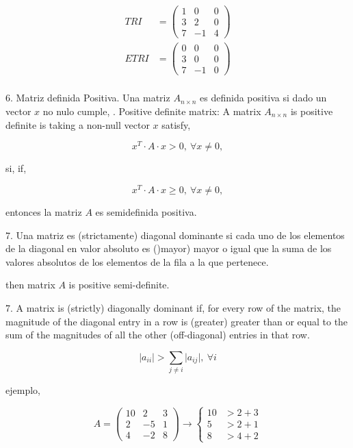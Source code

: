 \begin{align*}
TRI&=\begin{pmatrix}
1 & 0 & 0\\
3 & 2 & 0\\
7 & -1 & 4
\end{pmatrix}\\
ETRI&=\begin{pmatrix}
0 & 0 & 0\\
3 & 0 & 0\\
7 & -1 & 0
\end{pmatrix}\\
\end{align*}
\begin{paracol}{2}
6. Matriz definida Positiva. Una matriz $A_{n \times n}$ es definida positiva si dado un vector $x$ no nulo cumple,
. Positive definite matrix: A matrix $A_{n\times n} $ is positive definite is taking a non-null vector $x$ satisfy,
\end{paracol}
\begin{equation*}
x^T\cdot A \cdot x > 0, \ \forall x\neq 0,
\end{equation*}
\begin{paracol}{2}
si,
\switchcolumn
if,
\end{paracol}
\begin{equation*}
x^T\cdot A \cdot x \geq 0, \ \forall x\neq 0,
\end{equation*}
\begin{paracol}{2}
entonces la matriz $A$ es semidefinida positiva.

7. Una matriz es (strictamente) diagonal dominante si cada uno de los elementos de la diagonal en valor absoluto es ()mayor) mayor o igual que la suma de los valores absolutos de los elementos de la fila a la  que pertenece.

\switchcolumn
then matrix $A$ is positive semi-definite.

7. A matrix is (strictly) diagonally dominant if, for every row of the matrix, the magnitude of the diagonal entry in a row is (greater) greater than or equal to the sum of the magnitudes of all the other (off-diagonal) entries in that row.
\end{paracol}

\begin{equation*}
\lvert a_{ii} \rvert > \sum_{j\neq i} \lvert a_{ij} \rvert, \ \forall i
\end{equation*}
\begin{paracol}{2}
ejemplo,
\end{paracol}
\begin{equation*}
A=\begin{pmatrix}
10& 2 & 3\\
2& -5 & 1\\
4& -2 & 8
\end{pmatrix}\rightarrow \left\{ \begin{aligned}
10& > 2+3\\
5&> 2+1\\
8& > 4+2
\end{aligned} \right. 
\end{equation*}

